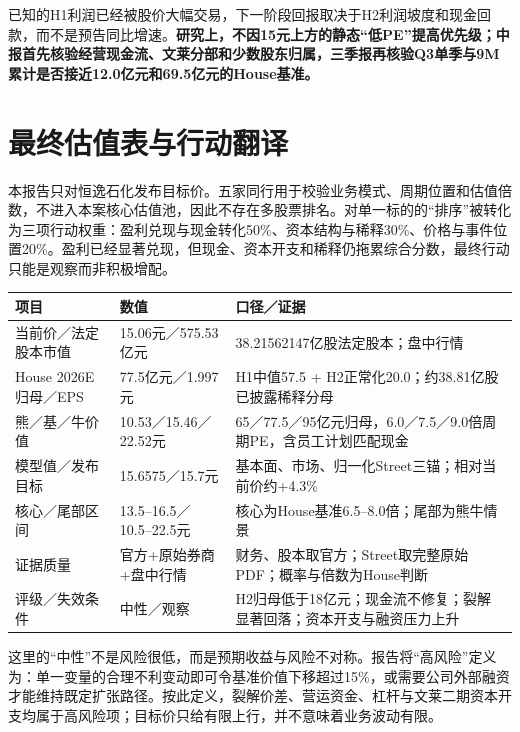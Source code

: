 \begin{keyinsight}[投资行动]
已知的H1利润已经被股价大幅交易，下一阶段回报取决于H2利润坡度和现金回款，而不是预告同比增速。\textbf{研究上，不因15元上方的静态“低PE”提高优先级；中报首先核验经营现金流、文莱分部和少数股东归属，三季报再核验Q3单季与9M累计是否接近12.0亿元和69.5亿元的House基准。}
\end{keyinsight}

\section{最终估值表与行动翻译}

本报告只对恒逸石化发布目标价。五家同行用于校验业务模式、周期位置和估值倍数，不进入本案核心估值池，因此不存在多股票排名。对单一标的的“排序”被转化为三项行动权重：盈利兑现与现金转化50\%、资本结构与稀释30\%、价格与事件位置20\%。盈利已经显著兑现，但现金、资本开支和稀释仍拖累综合分数，最终行动只能是观察而非积极增配。

\begin{exhibitbox}
\small
\noindent\begin{tabularx}{\textwidth}{L{3.35cm}R{2.45cm}X}
\toprule
\textbf{项目} & \textbf{数值} & \textbf{口径／证据} \\
\midrule
当前价／法定股本市值 & 15.06元／575.53亿元 & 38.21562147亿股法定股本；盘中行情 \\
House 2026E归母／EPS & 77.5亿元／1.997元 & H1中值57.5 + H2正常化20.0；约38.81亿股已披露稀释分母 \\
熊／基／牛价值 & 10.53／15.46／22.52元 & 65／77.5／95亿元归母，6.0／7.5／9.0倍周期PE，含员工计划匹配现金 \\
模型值／发布目标 & 15.6575／15.7元 & 基本面、市场、归一化Street三锚；相对当前价约+4.3\% \\
核心／尾部区间 & 13.5--16.5／10.5--22.5元 & 核心为House基准6.5--8.0倍；尾部为熊牛情景 \\
证据质量 & 官方+原始券商+盘中行情 & 财务、股本取官方；Street取完整原始PDF；概率与倍数为House判断 \\
评级／失效条件 & 中性／观察 & H2归母低于18亿元；现金流不修复；裂解显著回落；资本开支与融资压力上升 \\
\bottomrule
\end{tabularx}
\end{exhibitbox}

这里的“中性”不是风险很低，而是预期收益与风险不对称。报告将“高风险”定义为：单一变量的合理不利变动即可令基准价值下移超过15\%，或需要公司外部融资才能维持既定扩张路径。按此定义，裂解价差、营运资金、杠杆与文莱二期资本开支均属于高风险项；目标价只给有限上行，并不意味着业务波动有限。

